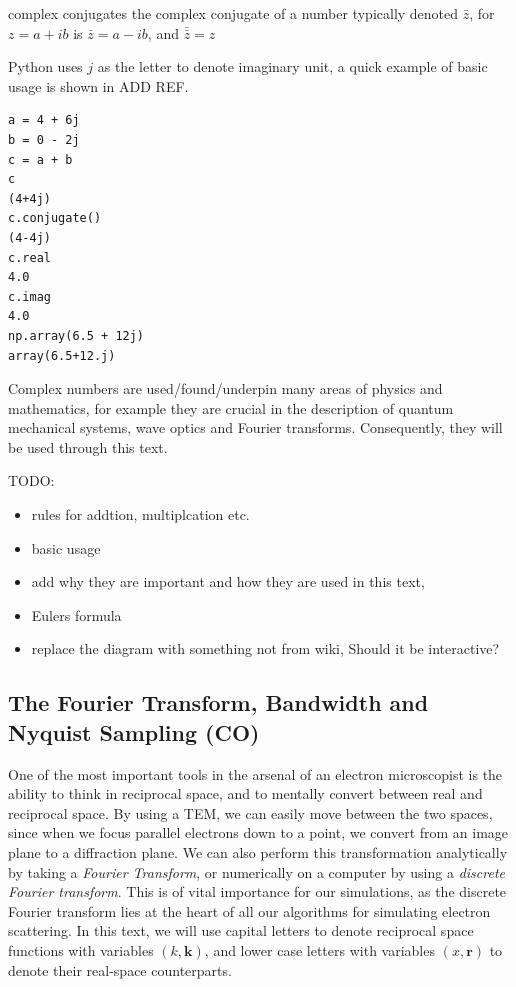 \documentclass[%
 superscriptaddress,
 aip,
 amsmath,amssymb,
preprint,%
 author-year,%
longbibliography
]{revtex4-2}
\begin{document}
complex conjugates
the complex conjugate of a number typically denoted $\bar{z}$,  for $z = a + ib$ is $\bar{z} = a - ib$, and $\bar{\bar{z}} = z$

Python uses $j$ as the letter to denote imaginary unit, a quick example of basic usage is shown in ADD REF.

\begin{lstlisting}[caption=Basic use of complex numbers in Python syntax]
a = 4 + 6j
b = 0 - 2j
c = a + b 
c 
(4+4j) 
c.conjugate()
(4-4j)
c.real
4.0
c.imag
4.0
np.array(6.5 + 12j)
array(6.5+12.j)
\end{lstlisting}

Complex numbers are used/found/underpin many areas of physics and mathematics, for example they are crucial in the description of quantum mechanical systems, wave optics and Fourier transforms. Consequently, they will be used through this text. 

TODO:
\begin{itemize}
  \item rules for addtion, multiplcation etc.
  \item basic usage
  \item add why they are important and how they are used in this text,
  \item Eulers formula 
  \item replace the diagram with something not from wiki, Should it be interactive?
\end{itemize}



\subsection*{The Fourier Transform, Bandwidth and Nyquist Sampling (CO)}

One of the most important tools in the arsenal of an electron microscopist is the ability to think in reciprocal space, and to mentally convert between real and reciprocal space. By using a TEM, we can easily move between the two spaces, since when we focus parallel electrons down to a point, we convert from an image plane to a diffraction plane. We can also perform this transformation analytically by taking a \emph{Fourier Transform}, or numerically on a computer by using a \emph{discrete Fourier transform}. This is of vital importance for our simulations, as the discrete Fourier transform lies at the heart of all our algorithms for simulating electron scattering. In this text, we will use capital letters to denote reciprocal space functions with variables $(k, \bm{k})$, and lower case letters with variables $(x, \bm{r})$ to denote their real-space counterparts.
\end{document}
